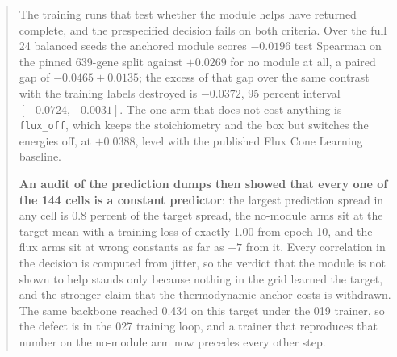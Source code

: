 \documentclass[10pt,a4paper]{article}
\begin{document}
\begin{abstract}
The training runs that test whether the module helps have returned complete, and the
prespecified decision fails on both criteria. Over the full 24 balanced seeds the anchored
module scores $-0.0196$ test Spearman on the pinned 639-gene split against $+0.0269$ for no
module at all, a paired gap of $-0.0465 \pm 0.0135$; the excess of that gap over the same
contrast with the training labels destroyed is $-0.0372$, 95 percent interval
$[-0.0724, -0.0031]$. The one arm that does not cost anything is \texttt{flux\_off}, which
keeps the stoichiometry and the box but switches the energies off, at $+0.0388$, level with
the published Flux Cone Learning baseline.

\textbf{An audit of the prediction dumps then showed that every one of the 144 cells is a
constant predictor}: the largest prediction spread in any cell is 0.8 percent of the target
spread, the no-module arms sit at the target mean with a training loss of exactly 1.00
from epoch 10, and the flux arms sit at wrong constants as far as $-7$ from it. Every
correlation in the decision is computed from jitter, so the verdict that the module is not
shown to help stands only because nothing in the grid learned the target, and the stronger
claim that the thermodynamic anchor costs is withdrawn. The same backbone reached 0.434 on
this target under the 019 trainer, so the defect is in the 027 training loop, and a trainer
that reproduces that number on the no-module arm now precedes every other step.
\end{abstract}

\vspace{0.5em}
\tccontents
\clearpage







\end{document}
